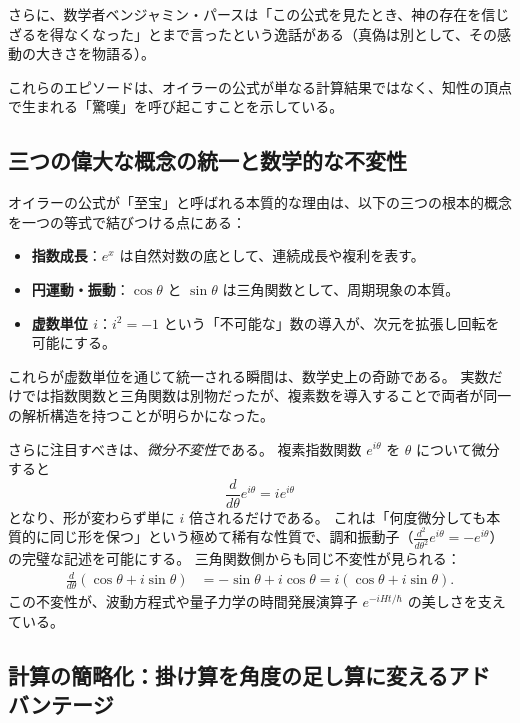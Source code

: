 \documentclass[dvipdfmx,a4paper]{jsbook}
\theoremstyle{definition}
\theoremstyle{remark}
\begin{document}
さらに、数学者ベンジャミン・パースは「この公式を見たとき、神の存在を信じざるを得なくなった」とまで言ったという逸話がある（真偽は別として、その感動の大きさを物語る）。

これらのエピソードは、オイラーの公式が単なる計算結果ではなく、知性の頂点で生まれる「驚嘆」を呼び起こすことを示している。

\subsection{三つの偉大な概念の統一と数学的な不変性}

オイラーの公式が「至宝」と呼ばれる本質的な理由は、以下の三つの根本的概念を一つの等式で結びつける点にある：
\begin{itemize}
  \item \textbf{指数成長}：$e^x$ は自然対数の底として、連続成長や複利を表す。
  \item \textbf{円運動・振動}：$\cos\theta$ と $\sin\theta$ は三角関数として、周期現象の本質。
  \item \textbf{虚数単位 $i$}：$i^2 = -1$ という「不可能な」数の導入が、次元を拡張し回転を可能にする。
\end{itemize}

これらが虚数単位を通じて統一される瞬間は、数学史上の奇跡である。
実数だけでは指数関数と三角関数は別物だったが、複素数を導入することで両者が同一の解析構造を持つことが明らかになった。

さらに注目すべきは、\emph{微分不変性}である。
複素指数関数 $e^{i\theta}$ を $\theta$ について微分すると
\begin{equation}
  \frac{d}{d\theta} e^{i\theta} = i e^{i\theta}
\end{equation}
となり、形が変わらず単に $i$ 倍されるだけである。
これは「何度微分しても本質的に同じ形を保つ」という極めて稀有な性質で、調和振動子（$\frac{d^2}{d\theta^2} e^{i\theta} = -e^{i\theta}$）の完璧な記述を可能にする。
三角関数側からも同じ不変性が見られる：
\begin{align}
  \frac{d}{d\theta} (\cos\theta + i\sin\theta) &= -\sin\theta + i\cos\theta = i (\cos\theta + i\sin\theta).
\end{align}
この不変性が、波動方程式や量子力学の時間発展演算子 $e^{-iHt/\hbar}$ の美しさを支えている。

\subsection{計算の簡略化：掛け算を角度の足し算に変えるアドバンテージ}
\end{document}
